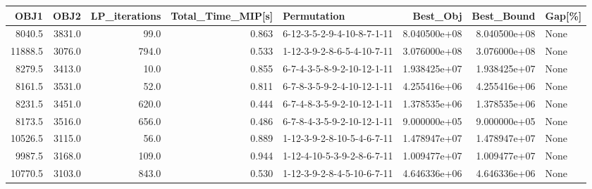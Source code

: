 \begin{tabular}{rrrrlrrl}
\toprule
    OBJ1 &    OBJ2 &  LP\_iterations &  Total\_Time\_MIP[s] &                 Permutation &      Best\_Obj &    Best\_Bound & Gap[\%] \\
\midrule
  8040.5 &  3831.0 &           99.0 &              0.863 &  6-12-3-5-2-9-4-10-8-7-1-11 &  8.040500e+08 &  8.040500e+08 &   None \\
 11888.5 &  3076.0 &          794.0 &              0.533 &  1-12-3-9-2-8-6-5-4-10-7-11 &  3.076000e+08 &  3.076000e+08 &   None \\
  8279.5 &  3413.0 &           10.0 &              0.855 &  6-7-4-3-5-8-9-2-10-12-1-11 &  1.938425e+07 &  1.938425e+07 &   None \\
  8161.5 &  3531.0 &           52.0 &              0.811 &  6-7-8-3-5-9-2-4-10-12-1-11 &  4.255416e+06 &  4.255416e+06 &   None \\
  8231.5 &  3451.0 &          620.0 &              0.444 &  6-7-4-8-3-5-9-2-10-12-1-11 &  1.378535e+06 &  1.378535e+06 &   None \\
  8173.5 &  3516.0 &          656.0 &              0.486 &  6-7-8-4-3-5-9-2-10-12-1-11 &  9.000000e+05 &  9.000000e+05 &   None \\
 10526.5 &  3115.0 &           56.0 &              0.889 &  1-12-3-9-2-8-10-5-4-6-7-11 &  1.478947e+07 &  1.478947e+07 &   None \\
  9987.5 &  3168.0 &          109.0 &              0.944 &  1-12-4-10-5-3-9-2-8-6-7-11 &  1.009477e+07 &  1.009477e+07 &   None \\
 10770.5 &  3103.0 &          843.0 &              0.530 &  1-12-3-9-2-8-4-5-10-6-7-11 &  4.646336e+06 &  4.646336e+06 &   None \\
\bottomrule
\end{tabular}

